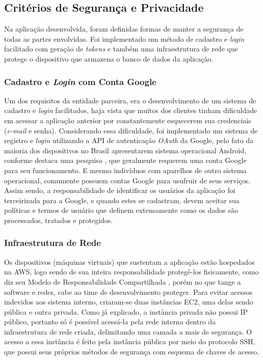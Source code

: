 \subsection{Critérios de Segurança e Privacidade}
Na aplicação desenvolvida, foram definidas formas de manter a segurança de todas as partes envolvidas. Foi implementado um método de cadastro e \textit{login} facilitado com geração de \textit{tokens} e também uma infraestrutura de rede que protege o dispositivo que armazena o banco de dados da aplicação.

\subsubsection{Cadastro e \emph{Login} com Conta Google}
Um dos requisitos da entidade parceira, era o desenvolvimento de um sistema de cadastro e \emph{login} facilitados, haja vista que muitos dos clientes tinham dificuldade em acessar a aplicação anterior por constantemente esquecerem sua credenciais (\emph{e-mail} e senha).
Considerando essa dificuldade, foi implementado um sistema de registro e \emph{login} utilizando a API de autenticação \emph{OAuth} da Google, pelo fato da maioria dos dispositivos no Brasil apresentarem sistema operacional Android, conforme destaca uma pesquisa \cite{app-my-site}, que geralmente requerem uma conta Google para seu funcionamento. E mesmo indivíduos com aparelhos de outro sistema operacional, comumente possuem contas Google para usufruir de seus serviços.
Assim sendo, a responsabilidade de identificar os usuários da aplicação foi terceirizada para a Google, e quando estes se cadastram, devem aceitar sua políticas e termos de usuário que definem extensamente como os dados são processados, tratados e protegidos.

\subsubsection{Infraestrutura de Rede}
Os dispositivos (máquinas virtuais) que sustentam a aplicação estão hospedados na AWS, logo sendo de sua inteira responsabilidade protegê-los fisicamente, como diz seu Modelo de Responsabilidade Compartilhada \cite{aws-shared-responsibilities}, porém no que tange a software e redes, cabe ao time de desenvolvimento proteger.
Para evitar acessos indevidos aos sistema interno, criaram-se duas instâncias EC2, uma delas sendo pública e outra privada. Como já explicado, a instância privada não possui IP público, portanto só é possível acessá-la pela rede interna dentro da infraestrutura de rede criada, delimitando uma camada a mais de segurança.
O acesso a essa instância é feito pela instância pública por meio do protocolo SSH, que possui seus próprios métodos de segurança com esquema de chaves de acesso.

